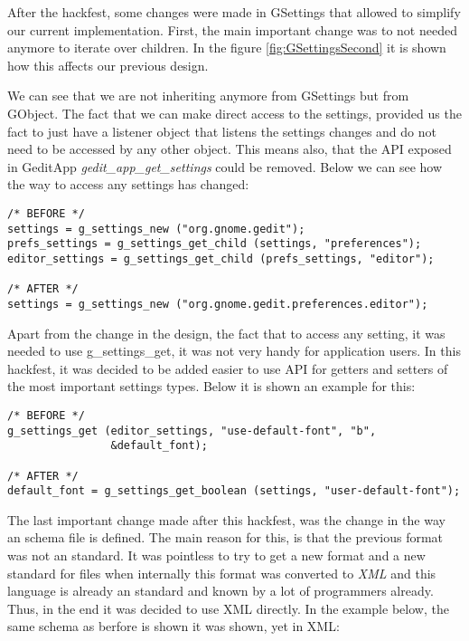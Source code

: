 After the hackfest, some changes were made in GSettings that allowed to simplify our current implementation. First, the main important change was to not needed anymore to iterate over children. In the figure \ref{fig:GSettingsSecond} it is shown how this affects our previous design.


We can see that we are not inheriting anymore from GSettings but from GObject. The fact that we can make direct access to the settings, provided us the fact to just have a listener object that listens the settings changes and do not need to be accessed by any other object. This means also, that the API exposed in GeditApp \emph{gedit\_app\_get\_settings} could be removed. Below we can see how the way to access any settings has changed:

\begin{lstlisting}[style=GObject]
/* BEFORE */
settings = g_settings_new ("org.gnome.gedit");
prefs_settings = g_settings_get_child (settings, "preferences");
editor_settings = g_settings_get_child (prefs_settings, "editor");

/* AFTER */
settings = g_settings_new ("org.gnome.gedit.preferences.editor");
\end{lstlisting}

Apart from the change in the design, the fact that to access any setting, it was needed to use g\_settings\_get, it was not very handy for application users. In this hackfest, it was decided to be added easier to use API for getters and setters of the most important settings types. Below it is shown an example for this:

\begin{lstlisting}[style=GObject]
/* BEFORE */
g_settings_get (editor_settings, "use-default-font", "b",
                &default_font);

/* AFTER */
default_font = g_settings_get_boolean (settings, "user-default-font");
\end{lstlisting}

The last important change made after this hackfest, was the change in the way an schema file is defined. The main reason for this, is that the previous format was not an standard. It was pointless to try to get a new format and a new standard for files when internally this format was converted to \emph{XML} and this language is already an standard and known by a lot of programmers already. Thus, in the end it was decided to use XML directly. In the example below,  the same schema as berfore is shown it was shown, yet in XML:

